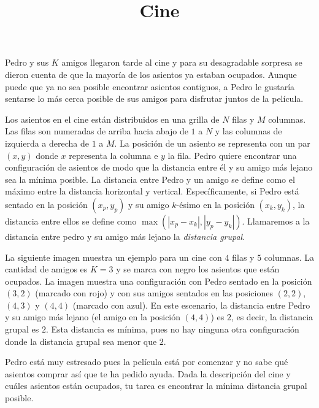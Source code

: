 \documentclass{oci}
\title{Cine}
\newcommand{\cine}{
    \fill[black] (1,3) rectangle (2,4);
    \fill[black] (2,3) rectangle (3,4);
    \fill[black] (3,3) rectangle (4,4);

    \fill[black] (0,2) rectangle (1,3);
    \fill[black] (3,2) rectangle (4,3);
    \fill[black] (4,2) rectangle (5,3);

    \fill[black] (0,1) rectangle (1,2);
    \fill[black] (1,1) rectangle (2,2);
    \fill[black] (2,1) rectangle (3,2);
    \fill[black] (4,1) rectangle (5,2);

    \fill[black] (2,0) rectangle (3,1);


    \foreach \x in {1, 2, 3, 4, 5} {
        \node[above] at (\x-1+0.5, 4) {\small\x};
    }
    \foreach \y in {1, 2, 3, 4} {
        \node[left] at (0, 4-\y+0.5) {\small\y};
    }
    \draw (0,0) grid (5,4);
}
\begin{document}
\begin{problemDescription}
    Pedro y sus $K$ amigos llegaron tarde al cine y
    para su desagradable sorpresa se dieron cuenta
    de que la mayoría de los asientos ya estaban ocupados.
    Aunque puede que ya no sea posible encontrar
    asientos contiguos, a Pedro le gustaría sentarse
    lo más cerca posible de sus amigos para disfrutar
    juntos de la película.

    Los asientos en el cine están distribuidos en una
    grilla de $N$ filas y $M$ columnas.
    Las filas son numeradas de arriba hacia abajo
    de $1$ a $N$ y las columnas de izquierda a derecha
    de $1$ a $M$.
    La posición de un asiento se representa con un par
    $(x, y)$ donde $x$ representa la columna e $y$ la fila.
    Pedro quiere encontrar una configuración de asientos
    de modo que la distancia entre él y su amigo más
    lejano sea la mínima posible.
    La distancia entre Pedro y un amigo se define
    como el máximo entre la distancia horizontal y vertical.
    Específicamente, si Pedro está sentado en la posición
    $(x_p, y_p)$ y su amigo $k$-ésimo en la posición
    $(x_k, y_k)$, la distancia entre ellos se define como
    $\max(|x_p - x_k|, |y_p - y_k|)$.
    Llamaremos a la distancia entre pedro y su amigo más
    lejano la \emph{distancia grupal}.

    La siguiente imagen muestra un ejemplo para un cine
    con $4$ filas y $5$ columnas.
    La cantidad de amigos es $K=3$ y se marca con negro
    los asientos que están ocupados.
    La imagen muestra una configuración con Pedro sentado en
    la posición $(3, 2)$ (marcado con {\color{pedro} rojo}) y
    con sus amigos sentados en las posiciones $(2, 2)$, $(4, 3)$ y $(4, 4)$
    (marcado con {\color{amigo} azul}).
    En este escenario, la distancia entre Pedro y su amigo
    más lejano (el amigo en la posición $(4, 4)$) es $2$,
    es decir, la distancia grupal es $2$.
    Esta distancia es mínima, pues no hay ninguna
    otra configuración donde la distancia grupal
    sea menor que $2$.

    \begin{figure}[h]
        \centering
    \end{figure}

    Pedro está muy estresado pues la película está por comenzar y
    no sabe qué asientos comprar así que te ha pedido ayuda.
    Dada la descripción del cine y cuáles asientos están ocupados,
    tu tarea es encontrar la mínima distancia grupal posible.

\end{problemDescription}
\end{document}

